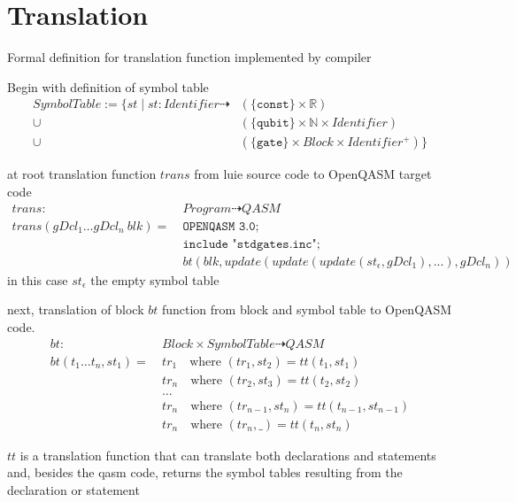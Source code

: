 \section{Translation}
\label{sec:concept_translation}
Formal definition for translation function implemented by compiler

Begin with definition of symbol table
\begin{align*}
    SymbolTable := \{st \mid st : Identifier \dashrightarrow &(\{\texttt{const}\} \times \mathbb{R})\\
                                                    \cup    &(\{\texttt{qubit}\} \times \mathbb{N} \times Identifier)\\
                                                    \cup    &(\{\texttt{gate}\} \times Block \times Identifier^+)
                                                    \}
\end{align*}

at root translation function $trans$ from luie source code to OpenQASM target code
\begin{align*}
    trans : \ & Program \dashrightarrow QASM\\
    trans(gDcl_1 \dots gDcl_n \ blk) = \ & \texttt{OPENQASM 3.0;}\\
                & \texttt{include "stdgates.inc";}\\
                & bt(blk, update(update(update(st_\epsilon, gDcl_1), ...), gDcl_n))
\end{align*}  
in this case $st_\epsilon$ the empty symbol table

next, translation of block $bt$ function from block and symbol table to OpenQASM code.  
\begin{align*}
    bt : \ & Block \times SymbolTable \dashrightarrow QASM\\
    bt(t_1 \dots t_n, st_1) = \ &  tr_1 \quad \text{where } (tr_1, st_2) = tt(t_1, st_1)\\
    & tr_n \quad \text{where } (tr_2, st_3) = tt(t_2, st_2)\\
    & \dots\\
    & tr_n \quad \text{where } (tr_{n - 1}, st_n) = tt(t_{n - 1}, st_{n - 1})\\
    & tr_n \quad \text{where } (tr_n, \_) = tt(t_n, st_n)
\end{align*}

$tt$ is a translation function that can translate both declarations and statements and, besides the qasm code, returns the symbol tables resulting from the declaration or statement

